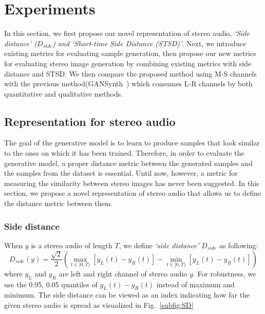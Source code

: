 \section{Experiments}
\label{sec:experiment}

In this section, we first propose our novel representation of stereo audio, \textit{`Side distance' ($D_{side}$) and `Short-time Side Distance (STSD)'}. Next, we introduce existing metrics for evaluating sample generation, then propose our new metrics for evaluating stereo image generation by combining existing metrics with side distance and STSD. We then compare the proposed method using M-S channels with the previous method(GANSynth~\cite{gansynth}) which consumes L-R channels by both quantitative and qualitative methods.

\subsection{Representation for stereo audio}
\label{subsec:representation}
The goal of the generative model is to learn to produce samples that look similar to the ones on which it has been trained. Therefore, in order to evaluate the generative model, a proper distance metric between the generated samples and the samples from the dataset is essential. Until now, however, a metric for measuring the similarity between stereo images has never been suggested. In this section, we propose a novel representation of stereo audio that allows us to define the distance metric between them.

\subsubsection{Side distance}
\label{subsubsec:side_distance}

When $y$ is a stereo audio of length $T$, we define \textit{`side distance'} $D_{side}$ as following:
\begin{equation}
    D_{side}(y) = {\frac{\sqrt{2}}{2}}(\max_{t \in [0, T)} [y_L(t) - y_R(t)] - \min_{t \in [0, T)} [y_L(t) - y_R(t)])
\end{equation}
where $y_L$ and $y_R$ are left and right channel of stereo audio $y$. For robustness, we use the 0.95, 0.05 quantiles of $y_L(t) - y_R(t)$ instead of maximum and minimum. The side distance can be viewed as an index indicating how far the given stereo audio is spread as visualized in Fig.~\ref{subfig:SD}

